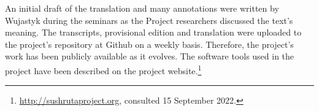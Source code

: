 An initial draft of the translation and many annotations were written by  
Wujastyk during the seminars as the Project researchers discussed the text's 
meaning. The transcripts, provisional edition and translation were uploaded to the 
project's repository at Github on a weekly basis. Therefore, the project's work has 
been publicly available as it evolves. The software tools used in the project have been 
described on the project website.\footnote{\url{http://sushrutaproject.org}, consulted
15 September 2022.}

%    
%    
%    

